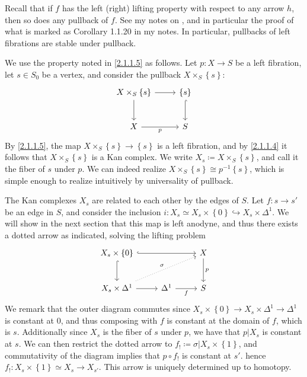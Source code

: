 \begin{remark}\label{2.1.1.5}
	Recall that if $f$ has the left (right) lifting property with respect to any arrow $h$, then so does any pullback of $f$. See my notes on \cite{hovey}, and in particular the proof of what is marked as Corollary 1.1.20 in my notes. In particular, pullbacks of left fibrations are stable under pullback.
\end{remark}

We use the property noted in \cref{2.1.1.5} as follows. Let $p : X \to S$ be a left fibration, let $s\in S_0$ be a vertex, and consider the pullback $X\times _S\left\{ s \right\} $:
\[\begin{tikzcd}[row sep = 2.5em, column sep = 2.5em]
X\times _S\left\{ s \right\} \ar[r] \ar[d]  & \left\{ s \right\} \ar[hook, d]  \\
X \ar[" p "', r]  & S
\end{tikzcd}\]
By \cref{2.1.1.5}, the map $X\times _S\left\{ s \right\} \to \left\{ s \right\} $ is a left fibration, and by \cref{2.1.1.4} it follows that $X\times_S\left\{ s \right\} $ is a Kan complex. We write $X_s \coloneqq X\times _S\left\{ s \right\} $, and call it the fiber of $s$ under $p$. We can indeed realize $X\times _S\left\{ s \right\} \cong p ^{-1} \left\{ s \right\} $, which is simple enough to realize intuitively by universality of pullback.

The Kan complexes $X_s$ are related to each other by the edges of $S$. Let $f : s \to s'$ be an edge in $S$, and consider the inclusion $i : X_s \simeq X_s \times \left\{ 0 \right\} \hookrightarrow X_s \times \Delta ^1$. We will show in the next section that this map is left anodyne, and thus there exists a dotted arrow as indicated, solving the lifting problem
\[\begin{tikzcd}[row sep = 2.5em, column sep = 2.5em]
	X_s \times \left\{ 0 \right\} \ar[hook, rr] \ar[hook, d]  && X \ar[" p ", d]  \\
X_s \times \Delta ^1 \ar[r]\ar[" \sigma  ", dotted, urr]   & \Delta ^1 \ar[" f "', r] & S
\end{tikzcd}\]
We remark that the outer diagram commutes since $X_s\times \left\{ 0 \right\} \to X_s\times \Delta ^1\to \Delta ^1$ is constant at 0, and thus composing with $f$ is constant at the domain of $f$, which is $s$. Additionally since $X_s$ is the fiber of $s$ under $p$, we have that $p|X_s$ is constant at $s$. We can then restrict the dotted arrow to $f_! \coloneqq \sigma |X_s \times \left\{ 1 \right\} $, and commutativity of the diagram implies that $p\circ f_!$ is constant at $s'$. hence $f_! : X_s \times \left\{ 1 \right\}\simeq X_s  \to X_{s'} $. This arrow is uniquely determined up to homotopy.

